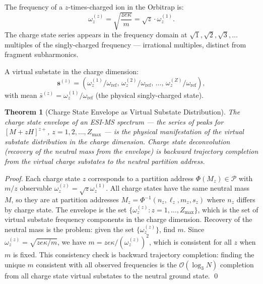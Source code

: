 \documentclass[twocolumn,10pt,a4paper]{article}
\theoremstyle{thmstyle}
\newtheorem{theorem}{Theorem}[section]
\theoremstyle{definition}
\theoremstyle{remark}
\newcommand{\Parts}{\mathcal{P}}
\newcommand{\PhiMap}{\varPhi}
\begin{document}
The frequency of a $z$-times-charged ion in the Orbitrap is:
\begin{equation}
\omega_z^{(z)} = \sqrt{\frac{ze\kappa}{m}} = \sqrt{z}\cdot\omega_z^{(1)}.
\label{eq:charge-freq}
\end{equation}
The charge state series appears in the frequency domain at
$\sqrt{1}, \sqrt{2}, \sqrt{3}, \ldots$ multiples of the singly-charged
frequency --- irrational multiples, distinct from fragment subharmonics.

A virtual substate in the charge dimension:
\begin{equation}
\mathbf{s}^{(z)} = \left(\omega_z^{(1)}/\omega_{\text{ref}},\,
\omega_z^{(2)}/\omega_{\text{ref}},\, \ldots,\,
\omega_z^{(Z)}/\omega_{\text{ref}}\right),
\label{eq:charge-vs}
\end{equation}
with mean $\bar{s}^{(z)} = \omega_z^{(1)}/\omega_{\text{ref}}$ (the
physical singly-charged state).

\begin{theorem}[Charge State Envelope as Virtual Substate Distribution]
\label{thm:charge-envelope}
The charge state envelope of an ESI-MS spectrum --- the series of peaks
for $[M+zH]^{z+}$, $z = 1, 2, \ldots, Z_{\max}$ --- is the physical
manifestation of the virtual substate distribution in the charge
dimension. Charge state deconvolution (recovery of the neutral mass
from the envelope) is backward trajectory completion from the virtual
charge substates to the neutral partition address.
\end{theorem}

\begin{proof}
Each charge state $z$ corresponds to a partition address
$\PhiMap(M_z) \in \Parts$ with $m/z$ observable $\omega_z^{(z)} = \sqrt{z}\omega_z^{(1)}$.
All charge states have the same neutral mass $M$, so they are at
partition addresses $M_{z} = \PhiMap^{-1}(n_z, \ell_z, m_z, s_z)$
where $n_z$ differs by charge state. The envelope is the set
$\{\omega_z^{(z)}: z = 1,\ldots,Z_{\max}\}$, which is the set of
virtual substate frequency components in the charge dimension.
Recovery of the neutral mass is the problem: given the set
$\{\omega_z^{(z)}\}$, find $m$. Since $\omega_z^{(z)} = \sqrt{ze\kappa/m}$,
we have $m = ze\kappa/(\omega_z^{(z)})^2$, which is consistent for
all $z$ when $m$ is fixed. This consistency check is backward trajectory
completion: finding the unique $m$ consistent with all observed
frequencies is the $\mathcal{O}(\log_3 N)$ completion from all charge
state virtual substates to the neutral ground state. \qed
\end{proof}
\end{document}
